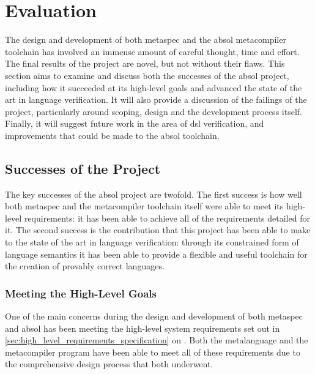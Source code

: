 \chapter{Evaluation} %
\label{cha:evaluation}
The design and development of both \gls{metaspec} and the \gls{absol} metacompiler toolchain has involved an immense amount of careful thought, time and effort.
The final results of the project are novel, but not without their flaws.
This section aims to examine and discuss both the successes of the \gls{absol} project, including how it succeeded at its high-level goals and advanced the state of the art in language verification.
It will also provide a discussion of the failings of the project, particularly around scoping, design and the development process itself.
Finally, it will suggest future work in the area of \gls{dsl} verification, and improvements that could be made to the \gls{absol} toolchain.

\section{Successes of the Project} %
\label{sec:successes_of_the_project}
The key successes of the \gls{absol} project are twofold. 
The first success is how well both \gls{metaspec} and the metacompiler toolchain itself were able to meet its high-level requirements: it has been able to achieve all of the requirements detailed for it.
The second success is the contribution that this project has been able to make to the state of the art in language verification: through its constrained form of language semantics it has been able to provide a flexible and useful toolchain for the creation of provably correct languages. 

\subsection{Meeting the High-Level Goals} %
\label{sub:meeting_the_high_level_goals}
One of the main concerns during the design and development of both \gls{metaspec} and \gls{absol} has been meeting the high-level system requirements set out in \autoref{sec:high_level_requirements_specification} on . 
Both the metalanguage and the metacompiler program have been able to meet all of these requirements due to the comprehensive design process that both underwent. \\

